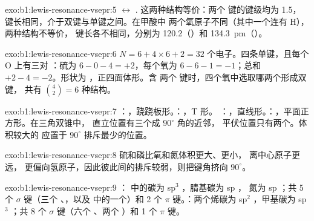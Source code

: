 \begin{solution}{exo:b1:lewis-resonance-vsepr:5}
$\leftrightarrow$
.
这两种结构等价：两个  键的键级均为 1.5，
键长相同，介于双键与单键之间。在甲酸中
两个氧原子不同（其中一个连有 H），两种结构不等价，
键长各不相同，分别为 120.2（）和
\qty{134.3}{pm}（）。
\end{solution}

\begin{solution}{exo:b1:lewis-resonance-vsepr:6}
$N = 6 + 4 \times 6 + 2 = 32$ 个电子。四条单键，且每个 O 上有三对
：硫为 $6 - 0 - 4 = +2$，每个氧为
$6 - 6 - 1 = -1$；总和 $+2 - 4 = -2$。形状为 ，正四面体形。含
两个  键时，四个氧中选取哪两个形成双键，
共有 $\binom{4}{2} = 6$ 种结构。
\end{solution}

\begin{solution}{exo:b1:lewis-resonance-vsepr:7}
：，跷跷板形。：，T 形。
：，直线形。：，平面正方形。在三角双锥中，
直立位置有三个成 $90^\circ$ 角的近邻，
平伏位置只有两个。体积较大的
应置于 $90^\circ$ 排斥最少的位置。
\end{solution}

\begin{solution}{exo:b1:lewis-resonance-vsepr:8}
硫和磷比氧和氮体积更大、更小，
离中心原子更远，
更偏向氢原子，因此彼此间的排斥较弱，则把键角挤向 $90^\circ$。
\end{solution}

\begin{solution}{exo:b1:lewis-resonance-vsepr:9}
： 中的碳为 sp$^3$ ，腈基碳为 sp ，
氮为 sp ；共 5 个 $\sigma$ 键（三个 、，以及
 中的一个）和 2 个 $\pi$ 键。：两个烯碳为
sp$^2$ ，甲基碳为 sp$^3$ ；共 8 个 $\sigma$ 键（六个 、两个
）和 1 个 $\pi$ 键。
\end{solution}

